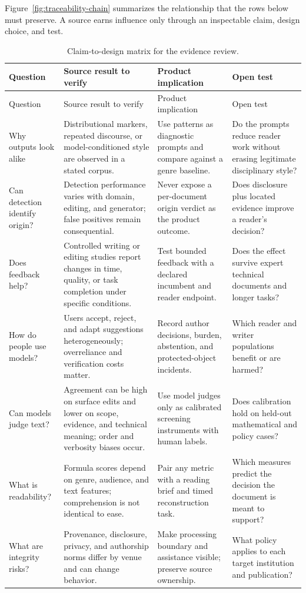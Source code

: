 Figure~\ref{fig:traceability-chain} summarizes the relationship that the rows
below must preserve. A source earns influence only through an inspectable
claim, design choice, and test.

\hvFigureTraceability

\begin{longtable}{@{}>{\raggedright\arraybackslash}p{}
>{\raggedright\arraybackslash}p{}
>{\raggedright\arraybackslash}p{}
>{\raggedright\arraybackslash}p{}@{}}
\caption{Claim-to-design matrix for the evidence review.}
\label{tab:literature-claim-design}\\
\toprule
Question & Source result to verify & Product implication & Open test \\
\midrule
\endfirsthead
\toprule
Question & Source result to verify & Product implication & Open test \\
\midrule
\endhead
Why outputs look alike & Distributional markers, repeated discourse, or
model-conditioned style are observed in a stated corpus. & Use patterns as
diagnostic prompts and compare against a genre baseline. & Do the prompts
reduce reader work without erasing legitimate disciplinary style? \\
Can detection identify origin? & Detection performance varies with domain,
editing, and generator; false positives remain consequential. & Never expose
a per-document origin verdict as the product outcome. & Does disclosure plus
located evidence improve a reader's decision? \\
Does feedback help? & Controlled writing or editing studies report changes in
time, quality, or task completion under specific conditions. & Test bounded
feedback with a declared incumbent and reader endpoint. & Does the effect
survive expert technical documents and longer tasks? \\
How do people use models? & Users accept, reject, and adapt suggestions
heterogeneously; overreliance and verification costs matter. & Record author
decisions, burden, abstention, and protected-object incidents. & Which reader
and writer populations benefit or are harmed? \\
Can models judge text? & Agreement can be high on surface edits and lower on
scope, evidence, and technical meaning; order and verbosity biases occur. &
Use model judges only as calibrated screening instruments with human labels. &
Does calibration hold on held-out mathematical and policy cases? \\
What is readability? & Formula scores depend on genre, audience, and text
features; comprehension is not identical to ease. & Pair any metric with a
reading brief and timed reconstruction task. & Which measures predict the
decision the document is meant to support? \\
What are integrity risks? & Provenance, disclosure, privacy, and authorship
norms differ by venue and can change behavior. & Make processing boundary and
assistance visible; preserve source ownership. & What policy applies to each
target institution and publication? \\
\bottomrule
\end{longtable}

